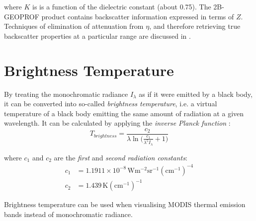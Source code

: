 \noindent where $K$ is is a function of the dielectric constant (about 0.75).
The
2B-GEOPROF product contains backscatter information expressed in terms of $Z$.
Techniques of elimination of attenuation from $\eta$, and therefore retrieving
true backscatter properties at a particular range are discussed in
\cite{Li2001}.

\section{Brightness Temperature}
By treating the monochromatic radiance $I_\lambda$ as if it were emitted by a
black
body, it can be converted into so-called \textit{brightness temperature}, i.e. a
virtual
temperature of a black body emitting the same amount of radiation at a given
wavelength. It can be calculated by applying the \textit{inverse Planck function}
\citep{Houghton2002}:
\begin{equation}
T_{brightness} = \frac{c_2}{\lambda \ln\big(\frac{c_1}{\lambda^5 I_\lambda} +
1\big)}
\end{equation}

\noindent where $c_1$ and $c_2$ are the \textit{first} and \textit{second
radiation constants}:
\begin{align}
c_1 &= 1.1911 \times 10^{-8} \, \mathrm{W m^{-2} sr^{-1}
\left(cm^{-1}\right)^{-4}}\\
c_2 &= 1.439 \, \mathrm{K \left(cm^{-1}\right)^{-1}}
\end{align}

\noindent Brightness temperature can be used when visualising MODIS thermal
emission bands instead of monochromatic radiance.
